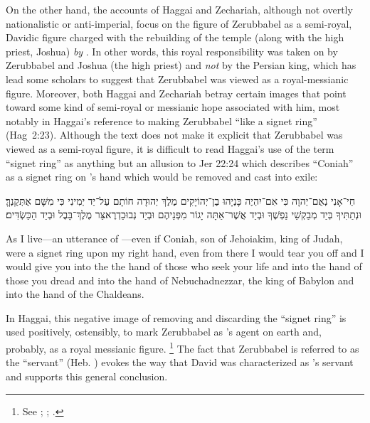 On the other hand, the accounts of Haggai and Zechariah, although not overtly nationalistic or anti-imperial, focus on the figure of Zerubbabel as a semi-royal, Davidic figure charged with the rebuilding of the temple (along with the high priest, Joshua) \emph{by \yahweh}. In other words, this royal responsibility was taken on by Zerubbabel and Joshua (the high priest) and \emph{not} by the Persian king, which has lead some scholars to suggest that Zerubbabel was viewed as a royal-messianic figure. Moreover, both Haggai and Zechariah betray certain images that point toward some kind of semi-royal or messianic hope associated with him, most notably in Haggai's reference to \yahweh making Zerubbabel ``like a signet ring'' (Hag~2:23). Although the text does not make it explicit that Zerubbabel was viewed as a semi-royal figure, it is difficult to read Haggai's use of the term ``signet ring'' as anything but an allusion to Jer 22:24 which describes ``Coniah'' as a signet ring on \yahweh's hand which would be removed and cast into exile:
\begin{hebrewtext}
    חַי־אָנִי נְאֻם־יְהוָה כִּי אִם־יִהְיֶה כָּנְיָהוּ בֶן־יְהוֹיָקִים מֶלֶךְ יְהוּדָה חוֹתָם עַל־יַד יְמִינִי כִּי מִשָּׁם אֶתְּקֶנְךָּ׃ 
    וּנְתַתִּיךָ בְּיַד מְבַקְשֵׁי נַפְשֶׁךָ וּבְיַד אֲשֶׁר־אַתָּה יָגוֹר מִפְּנֵיהֶם וּבְיַד נְבוּכַדְרֶאצַּר מֶלֶךְ־בָּבֶל וּבְיַד הַכַּשְׂדִּים׃
\end{hebrewtext}
\begin{translation}
    As I live---an utterance of \yahweh---even if Coniah, son of Jehoiakim, king of Judah, were a signet ring upon my right hand, even from there I would tear you off
    and I would give you into the the hand of those who seek your life and into the hand of those you dread and into the hand of Nebuchadnezzar, the king of Babylon and into the hand of the Chaldeans.
\end{translation}
\noindent
In Haggai, this negative image of \yahweh removing and discarding the ``signet ring'' is used positively, ostensibly, to mark Zerubbabel as \yahweh's agent on earth and, probably, as a royal messianic figure.%
    \footnote{See
        \cite[71--103]{blenkinsopp2013};
        \cite[2:281--284]{vonrad1962};
        \cite[187]{redditt_interpretation2007}.}
The fact that Zerubbabel is referred to as the ``servant'' (Heb. ) evokes the way that David was characterized as \yahweh's servant and supports this general conclusion.


